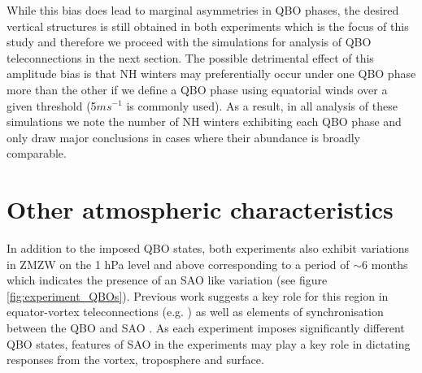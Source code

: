 While this bias does lead to marginal asymmetries in QBO phases, the desired vertical structures is still obtained in both experiments which is the focus of this study and therefore we proceed with the simulations for analysis of QBO teleconnections in the next section. The possible detrimental effect of this amplitude bias is that NH winters may preferentially occur under one QBO phase more than the other if we define a QBO phase using equatorial winds over a given threshold (5$ms^{-1}$ is commonly used). As a result, in all analysis of these simulations we note the number of NH winters exhibiting each QBO phase and only draw major conclusions in cases where their abundance is broadly comparable. 

\section{Other atmospheric characteristics}

In addition to the imposed QBO states, both experiments also exhibit variations in ZMZW on the 1 hPa level and above corresponding to a period of $\sim$6 months which indicates the presence of an SAO like variation (see figure \ref{fig:experiment_QBOs}). Previous work suggests a key role for this region in equator-vortex teleconnections (e.g. \cite{grayForecasting2020a}) as well as elements of synchronisation between the QBO and SAO \citep{kuaiNonstationary2009c}. As each experiment imposes significantly different QBO states, features of SAO in the experiments may play a key role in dictating responses from the vortex, troposphere and surface.

